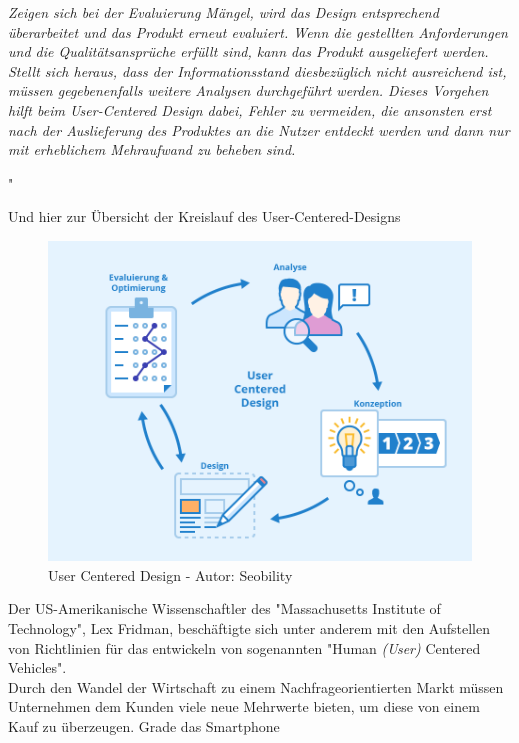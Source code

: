 {\begin{minipage}[c]{42em}
\begin{itemize}
	\textit{Zeigen sich bei der Evaluierung Mängel, wird das Design entsprechend überarbeitet und das Produkt erneut evaluiert. Wenn die gestellten Anforderungen und die Qualitätsansprüche erfüllt sind, kann das Produkt ausgeliefert werden. Stellt sich heraus, dass der Informationsstand diesbezüglich nicht ausreichend ist, müssen gegebenenfalls weitere Analysen durchgeführt werden. Dieses Vorgehen hilft beim User-Centered Design dabei, Fehler zu vermeiden, die ansonsten erst nach der Auslieferung des Produktes an die Nutzer entdeckt werden und dann nur mit erheblichem Mehraufwand zu beheben sind.}
	
\end{itemize}
"
\end{minipage}
}
\clearpage
Und hier zur Übersicht der Kreislauf des User-Centered-Designs\\
\begin{figure}[!h]
	\centering
	\includegraphics[width=0.734\columnwidth]{pictures/ucd.png}
	\caption{ User Centered Design - Autor: Seobility}
	\label{img:ucd}
\end{figure}
Der US-Amerikanische Wissenschaftler des "Massachusetts Institute of Technology", Lex Fridman, beschäftigte sich unter anderem mit den Aufstellen von Richtlinien für das entwickeln von sogenannten "Human \textit{(User)} Centered Vehicles".\\
Durch den Wandel der Wirtschaft zu einem Nachfrageorientierten Markt müssen Unternehmen dem Kunden viele neue Mehrwerte bieten, um diese von einem Kauf zu überzeugen. Grade das Smartphone 